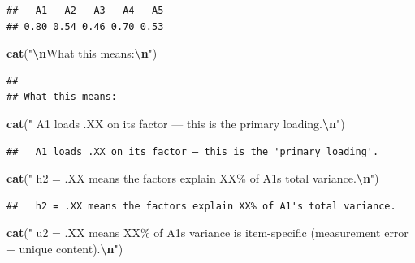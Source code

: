 \documentclass[
]{article}
\newenvironment{Shaded}{\begin{snugshade}}{\end{snugshade}}
\newcommand{\FunctionTok}[1]{\textcolor[rgb]{0.13,0.29,0.53}{\textbf{#1}}}
\newcommand{\NormalTok}[1]{#1}
\newcommand{\SpecialCharTok}[1]{\textcolor[rgb]{0.81,0.36,0.00}{\textbf{#1}}}
\newcommand{\StringTok}[1]{\textcolor[rgb]{0.31,0.60,0.02}{#1}}
\begin{document}
\begin{verbatim}
##   A1   A2   A3   A4   A5 
## 0.80 0.54 0.46 0.70 0.53
\end{verbatim}

\begin{Shaded}
\begin{Highlighting}[]
\FunctionTok{cat}\NormalTok{(}\StringTok{"}\SpecialCharTok{\textbackslash{}n}\StringTok{What this means:}\SpecialCharTok{\textbackslash{}n}\StringTok{"}\NormalTok{)}
\end{Highlighting}
\end{Shaded}

\begin{verbatim}
## 
## What this means:
\end{verbatim}

\begin{Shaded}
\begin{Highlighting}[]
\FunctionTok{cat}\NormalTok{(}\StringTok{"  A1 loads .XX on its factor — this is the \textquotesingle{}primary loading\textquotesingle{}.}\SpecialCharTok{\textbackslash{}n}\StringTok{"}\NormalTok{)}
\end{Highlighting}
\end{Shaded}

\begin{verbatim}
##   A1 loads .XX on its factor — this is the 'primary loading'.
\end{verbatim}

\begin{Shaded}
\begin{Highlighting}[]
\FunctionTok{cat}\NormalTok{(}\StringTok{"  h2 = .XX means the factors explain XX\% of A1\textquotesingle{}s total variance.}\SpecialCharTok{\textbackslash{}n}\StringTok{"}\NormalTok{)}
\end{Highlighting}
\end{Shaded}

\begin{verbatim}
##   h2 = .XX means the factors explain XX% of A1's total variance.
\end{verbatim}

\begin{Shaded}
\begin{Highlighting}[]
\FunctionTok{cat}\NormalTok{(}\StringTok{"  u2 = .XX means XX\% of A1\textquotesingle{}s variance is item{-}specific (measurement error + unique content).}\SpecialCharTok{\textbackslash{}n}\StringTok{"}\NormalTok{)}
\end{Highlighting}
\end{Shaded}
\end{document}
